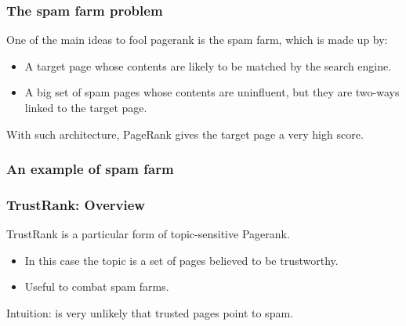 \documentclass{beamer}
\begin{document}
\begin{frame}
\frametitle{The spam farm problem}
One of the main ideas to fool pagerank is the \alert{spam farm}, which is made up by:
\vfill
\begin{itemize}
\item A target page whose contents are likely to be matched by the search engine.
\item A \alert{big} set of spam pages whose contents are uninfluent, but they are two-ways linked to the target page.
\end{itemize}
\vfill
With such architecture, PageRank gives the target page a very high score.
\end{frame}

\begin{frame}
\frametitle{An example of spam farm}
\end{frame}

\begin{frame}
\frametitle{TrustRank: Overview}
TrustRank is a particular form of topic-sensitive Pagerank.
\vfill
\begin{itemize}
\item In this case the topic is a set of pages believed to be \alert{trustworthy}.
\item Useful to combat spam farms.
\end{itemize}
\vfill
Intuition: is very unlikely that trusted pages point to spam.
\end{frame}
\end{document}
